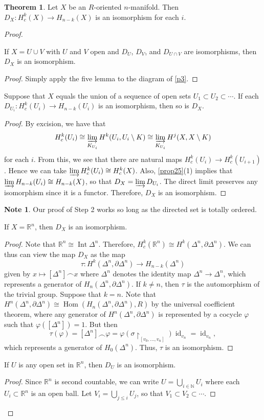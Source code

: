 \documentclass[10pt,letterpaper,cm]{nupset}
\theoremstyle{definition}
\newtheorem{note}[definition]{Note}
\theoremstyle{theorem}
\newtheorem{theorem}[definition]{Theorem}
\theoremstyle{remark}
\newcommand{\N}{\mathbb N}
\newcommand{\R}{\mathbb{R}}
\newcommand{\1}{\mathbb{1}}
\newcommand{\0}{\vec 0}
\DeclareMathOperator{\id}{id}
\DeclareMathOperator{\Int}{Int}
\DeclareMathOperator{\Hom}{Hom}
\begin{document}
\begin{theorem}
Let $X$ be an $R$-oriented $n$-manifold.  Then $D_X : H_c^k(X) \to H_{n-k}(X)$ is an isomorphism for each $i$.
\end{theorem}
\begin{proof} $ $
\begin{steps}
\item If $X= U \cup V$ with $U$ and $V$ open and $D_U$, $D_V$, and $D_{U \cap V}$ are isomorphisms, then $D_X$ is an isomorphism.
\begin{proof}
Simply apply the five lemma to the diagram of \cref{p3}. 
\end{proof}
\item Suppose that $X$ equals the union of a sequence of open sets $U_1 \subset U_2 \subset \cdots$. If each $D_{U_i} : H^k_c(U_i) \to H_{n-k}(U_i)$ is an isomorphism, then so is $D_X$.
\begin{proof}
By excision, we have that $$H^k_c(U_i) \cong \varinjlim_{K_{U_i}}H^k(U_i, U_i \setminus K) \cong  \varinjlim_{K_{U_i}}H^j(X, X \setminus K) $$ for each $i$. From this, we see that there are natural maps $H^k_c(U_i) \to H^k_c(U_{i+1})$. Hence we can take $\varinjlim H^k_c(U_i) \cong H^k_c(X)$. Also, \cref{prop25}(1) implies that $\varinjlim H_{n-k}(U_i) \cong H_{n-k}(X)$, so that $D_X = \varinjlim D_{U_i}$. The direct limit  preserves any isomorphism  since it is a functor. Therefore, $D_X$ is an isomorphism.
\end{proof}
\begin{note}
Our proof of Step 2 works so long as the directed set is totally ordered.
\end{note}
\item If $X = \R^n$, then $D_X$ is an isomorphism. 
\begin{proof}
Note that $\R^n \cong \Int{\Delta^n}$. Therefore, $H^k_c(\R^n) \cong H^k(\Delta^n, \partial{\Delta^n})$. We can thus can view the map $D_X$ as the map $$\tau : H^k(\Delta^n, \partial{\Delta^n}) \to H_{n-k}(\Delta^n)$$ given by $x \mapsto [\Delta^n] \frown x$ where $\Delta^n$ denotes the identity map $\Delta^n \to \Delta^n$, which represents a generator of $H_n(\Delta^n, \partial{\Delta^n})$. If $k\ne n$, then $\tau$ is the automorphism of the trivial group. Suppose that $k=n$. Note that $H^n(\Delta^n, \partial{\Delta^n}) \cong \Hom(H_n(\Delta^n, \partial{\Delta^n}), R)$ by the universal coefficient theorem, where any generator of $H^n(\Delta^n, \partial{\Delta^n})$ is represented by a cocycle $\varphi$ such that $\varphi([\Delta^n])=1$. But then $$\tau(\varphi) = [\Delta^n] \frown \varphi = \varphi(\sigma \restriction_{[v_0, \ldots, v_n]})\id_{v_n} =\id_{v_n},$$ which represents a generator of $H_0(\Delta^n)$. Thus, $\tau$ is an isomorphism. 
\end{proof}
\item If $U$ is any open set in $\R^n$, then $D_U$ is an isomorphism.
\begin{proof}
Since $\R^n$ is second countable, we can write $U =\bigcup_{i\in \N} U_i$ where each $U_i \subset \R^n$ is an open ball. Let $V_i = \bigcup_{j \leq i} U_j$, so that $V_1 \subset V_2\subset \cdots$. 


\end{proof}
\end{steps}
\end{proof}
\end{document}
